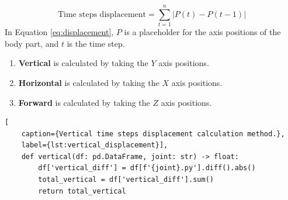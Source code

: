                 \begin{equation} \label{eq:displacement}
                    \text{Time steps displacement} = \sum_{t=1}^{n} \left| P(t) - P(t-1) \right|
                \end{equation}
                In Equation \ref{eq:displacement}, $P$ is a placeholder for the axis positions of the body part, and $t$ is the time step. 
                \begin{enumerate}
                    \item \textbf{Vertical} is calculated by taking the $Y$ axis positions.
                    \item \textbf{Horizontal} is calculated by taking the $X$ axis positions.
                    \item \textbf{Forward} is calculated by taking the $Z$ axis positions.
                \end{enumerate}
               
        \begin{lstlisting}[
    caption={Vertical time steps displacement calculation method.}, 
    label={lst:vertical_displacement}],     
    def vertical(df: pd.DataFrame, joint: str) -> float:
        df['vertical_diff'] = df[f'{joint}.py'].diff().abs()
        total_vertical = df['vertical_diff'].sum()
        return total_vertical
        \end{lstlisting}
\cleardoublepage